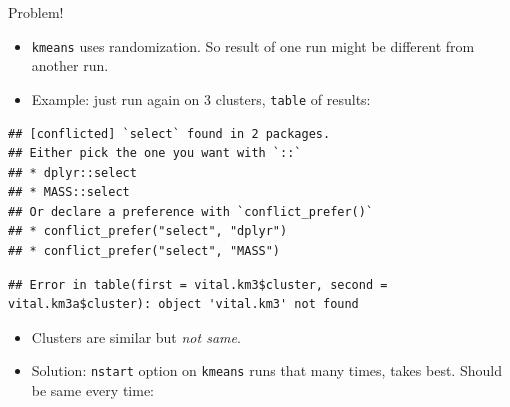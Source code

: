 \documentclass[ignorenonframetext,]{beamer}
\newenvironment{Shaded}{\begin{snugshade}}{\end{snugshade}}
\newcommand{\DataTypeTok}[1]{\textcolor[rgb]{0.13,0.29,0.53}{#1}}
\newcommand{\DecValTok}[1]{\textcolor[rgb]{0.00,0.00,0.81}{#1}}
\newcommand{\KeywordTok}[1]{\textcolor[rgb]{0.13,0.29,0.53}{\textbf{#1}}}
\newcommand{\NormalTok}[1]{#1}
\newcommand{\OperatorTok}[1]{\textcolor[rgb]{0.81,0.36,0.00}{\textbf{#1}}}
\newcommand{\StringTok}[1]{\textcolor[rgb]{0.31,0.60,0.02}{#1}}
\begin{document}
\begin{frame}[fragile]{Problem!}
\protect\hypertarget{problem}{}

\begin{itemize}
\item
  \texttt{kmeans} uses randomization. So result of one run might be
  different from another run.
\item
  Example: just run again on 3 clusters, \texttt{table} of results:
\end{itemize}

\begin{Shaded}
\end{Shaded}

\begin{verbatim}
## [conflicted] `select` found in 2 packages.
## Either pick the one you want with `::` 
## * dplyr::select
## * MASS::select
## Or declare a preference with `conflict_prefer()`
## * conflict_prefer("select", "dplyr")
## * conflict_prefer("select", "MASS")
\end{verbatim}

\begin{Shaded}
\end{Shaded}

\begin{verbatim}
## Error in table(first = vital.km3$cluster, second = vital.km3a$cluster): object 'vital.km3' not found
\end{verbatim}

\begin{itemize}
\item
  Clusters are similar but \emph{not same}.
\item
  Solution: \texttt{nstart} option on \texttt{kmeans} runs that many
  times, takes best. Should be same every time:
\end{itemize}

\begin{Shaded}
\end{Shaded}

\end{frame}
\end{document}
